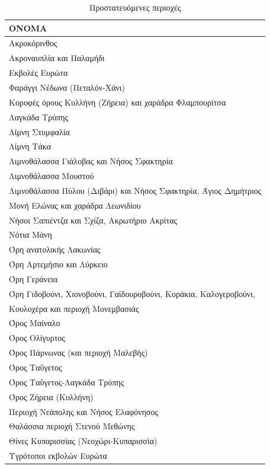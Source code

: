 \documentclass[12pt]{article}
\begin{document}
	\begin{table}[H]
		\centering
		\label{my-label}
		\begin{tabular}{|l|}
			\hline
			\textbf{ΟΝΟΜΑ} \\
			\hline
			Ακροκόρινθος \\ \hline
			Ακροναυπλία και Παλαμήδι \\ \hline
			Εκβολές Ευρώτα \\ \hline
			Φαράγγι Νέδωνα (Πεταλόν-Χάνι) \\ \hline
			Κορυφές όρους Κυλλήνη (Ζήρεια) και χαράδρα Φλαμπουρίτσα \\ \hline
			Λαγκάδα Τρύπης \\ \hline
			Λίμνη Στυμφαλία \\ \hline
			Λίμνη Τάκα \\ \hline
			Λιμνοθάλασσα Γιάλοβας και Νήσος Σφακτηρία \\ \hline
			Λιμνοθάλασσα Μουστού \\ \hline
			Λιμνοθάλασσα Πύλου (Διβάρι) και Νήσος Σφακτηρία, Άγιος Δημήτριος \\ \hline
			Μονή Ελώνας και χαράδρα Λεωνιδίου \\ \hline
			Νήσοι Σαπιέντζα και Σχίζα, Ακρωτήριο Ακρίτας \\ \hline
			Νότια Μάνη  \\   \hline 
			Όρη ανατολικής Λακωνίας \\ \hline
			Όρη Αρτεμήσιο και Λύρκειο \\ \hline
			Όρη Γεράνεια \\ \hline
			Όρη Γιδοβούνι, Χιονοβούνι, Γαϊδουροβούνι, Κοράκια, Καλογεροβούνι,\\ Κουλοχέρα και περιοχή Μονεμβασιάς \\ \hline
			Όρος Μαίναλο \\ \hline
			Όρος Ολίγυρτος \\ \hline
			Όρος Πάρνωνας (και περιοχή Μαλεβής) \\ \hline
			Όρος Ταΰγετος  \\ \hline
			Όρος Ταΰγετος-Λαγκάδα Τρύπης \\ \hline
			Όρος Ζήρεια (Κυλλήνη) \\ \hline
			Περιοχή Νεάπολης και Νήσος Ελαφόνησος \\ \hline
			Θαλάσσια περιοχή Στενού Μεθώνης \\ \hline 
			Θίνες Κυπαρισσίας (Νεοχώρι-Κυπαρισσία) \\ \hline
			Υγρότοποι εκβολών Ευρώτα \\ 
			\hline
		\end{tabular}
	\caption{Προστατευόμενες περιοχές}
	\end{table}
	
\end{document}
